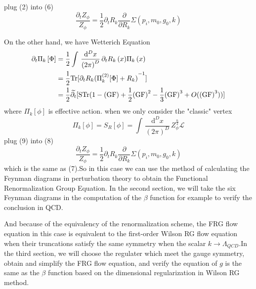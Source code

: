 \documentclass[UTF8]{ctexart}
\begin{document}
plug (2) into (6)
\begin{equation}
\frac{\partial_{t}Z_{\phi}}{Z_{\phi}}={\frac{1}{2}}{\partial_{t}R_k}{\frac{\partial}{\partial R_k}}\Sigma\left(p_i,m_0,g_0,k\right)
\end{equation}
\par On the other hand, we have Wetterich Equation
\begin{align}
\partial_t \Pi_k \left[\Phi\right]&={\frac{1}{2}}\int\,\frac{{\mathrm{d}^D}x}{{\left(2\pi\right)}^D}\,{\partial_{t}R_k\left(x\right)}\Pi_k\left(x\right)
\notag\\&=\frac{1}{2}\mathrm{Tr}[\partial_{t}R_{k}{(\Pi_{k}^{(2)} [\Phi]+R_{k})}^{-1}]
\notag\\&=\frac{1}{2}\widetilde{\partial_{t}}[\mathrm{STr}(1-\mathrm{(GF)}+\frac{1}{2}\mathrm{{(GF)}^2}-\frac{1}{3}\mathrm{{(GF)}^3}+O(\mathrm{{(GF)}^3}))]
\end{align}
where $\Pi_k[\phi]$ is effective action. when we only consider the "classic" vertex
\begin{equation}
\Pi_k[\phi]=S_R[\phi]=\int\,\frac{{\mathrm{d}^D}x}{{\left(2\pi\right)}^D}\,Z_{\phi}^{\frac n 2}\mathscr{L}
\end{equation}
plug (9) into (8)
\begin{equation}
\frac{\partial_{t}Z_{\phi}}{Z_{\phi}}={\frac{1}{2}}{\partial_{t}R_k}{\frac{\partial}{\partial R_k}}\Sigma\left(p_i,m_0,g_0,k\right)
\end{equation}
which is the same as (7).So in this case we can use the method of calculating the Feynman diagrams in perturbation theory to obtain the Functional Renormalization  Group Equation. In the second section, we will take the six Feynman diagrams in the computation of the $\beta$ function for example to verify the conclusion in QCD.
\par And because of the equivalency of the renormalization scheme, the FRG flow equation in this case is equivalent to the first-order Wilson RG flow equation when their truncations satisfy the same symmetry when the scalar $k\to\Lambda_{QCD}$.In the third section, we will choose the regulater which meet the gauge symmetry, obtain and simplify the FRG flow equation, and verify the equation of $g$ is the same as the $\beta$ function based on the dimensional regularization in Wilson RG method.
\end{document}
